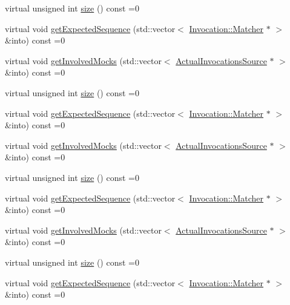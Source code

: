 \begin{DoxyCompactItemize}
\item 
virtual unsigned int \mbox{\hyperlink{classfakeit_1_1Sequence_aa9a45b45fc715148832a9dfb7b555556}{size}} () const =0
\item 
virtual void \mbox{\hyperlink{classfakeit_1_1Sequence_aa1a1e4ad2fcac3379ba38f250bf06884}{get\+Expected\+Sequence}} (std\+::vector$<$ \mbox{\hyperlink{structfakeit_1_1Invocation_1_1Matcher}{Invocation\+::\+Matcher}} $\ast$ $>$ \&into) const =0
\item 
virtual void \mbox{\hyperlink{classfakeit_1_1Sequence_a4af96a0de0fa659fe826431e4d61757a}{get\+Involved\+Mocks}} (std\+::vector$<$ \mbox{\hyperlink{structfakeit_1_1ActualInvocationsSource}{Actual\+Invocations\+Source}} $\ast$ $>$ \&into) const =0
\item 
virtual unsigned int \mbox{\hyperlink{classfakeit_1_1Sequence_aa9a45b45fc715148832a9dfb7b555556}{size}} () const =0
\item 
virtual void \mbox{\hyperlink{classfakeit_1_1Sequence_aa1a1e4ad2fcac3379ba38f250bf06884}{get\+Expected\+Sequence}} (std\+::vector$<$ \mbox{\hyperlink{structfakeit_1_1Invocation_1_1Matcher}{Invocation\+::\+Matcher}} $\ast$ $>$ \&into) const =0
\item 
virtual void \mbox{\hyperlink{classfakeit_1_1Sequence_a4af96a0de0fa659fe826431e4d61757a}{get\+Involved\+Mocks}} (std\+::vector$<$ \mbox{\hyperlink{structfakeit_1_1ActualInvocationsSource}{Actual\+Invocations\+Source}} $\ast$ $>$ \&into) const =0
\item 
virtual unsigned int \mbox{\hyperlink{classfakeit_1_1Sequence_aa9a45b45fc715148832a9dfb7b555556}{size}} () const =0
\item 
virtual void \mbox{\hyperlink{classfakeit_1_1Sequence_aa1a1e4ad2fcac3379ba38f250bf06884}{get\+Expected\+Sequence}} (std\+::vector$<$ \mbox{\hyperlink{structfakeit_1_1Invocation_1_1Matcher}{Invocation\+::\+Matcher}} $\ast$ $>$ \&into) const =0
\item 
virtual void \mbox{\hyperlink{classfakeit_1_1Sequence_a4af96a0de0fa659fe826431e4d61757a}{get\+Involved\+Mocks}} (std\+::vector$<$ \mbox{\hyperlink{structfakeit_1_1ActualInvocationsSource}{Actual\+Invocations\+Source}} $\ast$ $>$ \&into) const =0
\item 
virtual unsigned int \mbox{\hyperlink{classfakeit_1_1Sequence_aa9a45b45fc715148832a9dfb7b555556}{size}} () const =0
\item 
virtual void \mbox{\hyperlink{classfakeit_1_1Sequence_aa1a1e4ad2fcac3379ba38f250bf06884}{get\+Expected\+Sequence}} (std\+::vector$<$ \mbox{\hyperlink{structfakeit_1_1Invocation_1_1Matcher}{Invocation\+::\+Matcher}} $\ast$ $>$ \&into) const =0

\end{DoxyCompactItemize}
